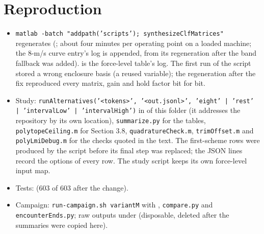 \documentclass[11pt]{article}
\begin{document}
\section{Reproduction}
\begin{itemize}
\item \texttt{matlab -batch "addpath('scripts'); synthesizeClfMatrices"}
  regenerates  (; about
  four minutes per operating point on a loaded machine; the 8-m/s curve
  entry's log is appended, from its regeneration after the band fallback
  was added).  is the force-level table's
  log. The first run of the script stored a wrong enclosure basis (a reused
  variable); the regeneration after the fix reproduced every matrix, gain
  and hold factor bit for bit.
\item Study: \texttt{runAlternatives('<tokens>', '<out.jsonl>', 'eight' |
  'rest' | 'intervalLow' | 'intervalHigh')} in  of this folder
  (it addresses the repository by its own location), \texttt{summarize.py}
  for the tables, \texttt{polytopeCeiling.m} for Section 3.8,
  \texttt{quadratureCheck.m}, \texttt{trimOffset.m} and
  \texttt{polyLmiDebug.m} for the checks quoted in the text. The first-scheme
  rows were produced by the script before its final step was replaced; the
  JSON lines record the options of every row. The study script keeps its own
  force-level input map.
\item Tests:  (603 of 603 after the change).
\item Campaign: \texttt{run-campaign.sh variantM} with
  ,
  \texttt{compare.py} and \texttt{encounterEnds.py}; raw outputs under
  (disposable, deleted after the summaries were copied here).
\end{itemize}
\end{document}

